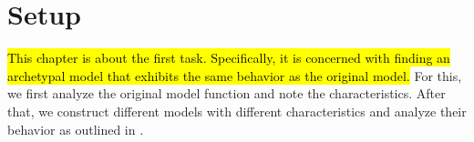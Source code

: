 \chapter{Setup}
\label{chap:setup}

\hl{
	This chapter is about the first task.
	Specifically, it is concerned with finding an archetypal model that exhibits the same behavior as the original model.
}
For this, we first analyze the original model function and note the characteristics.
After that, we construct different models with different characteristics and analyze their behavior as outlined in .







